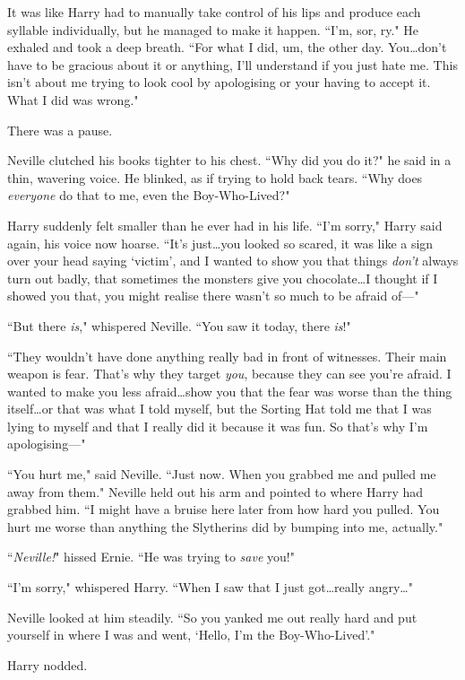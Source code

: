 It was like Harry had to manually take control of his lips and produce each syllable individually, but he managed to make it happen. ``I'm, sor, ry." He exhaled and took a deep breath. ``For what I did, um, the other day. You…don't have to be gracious about it or anything, I'll understand if you just hate me. This isn't about me trying to look cool by apologising or your having to accept it. What I did was wrong."

There was a pause.

Neville clutched his books tighter to his chest. ``Why did you do it?" he said in a thin, wavering voice. He blinked, as if trying to hold back tears. ``Why does \emph{everyone} do that to me, even the Boy-Who-Lived?"

Harry suddenly felt smaller than he ever had in his life. ``I'm sorry," Harry said again, his voice now hoarse. ``It's just…you looked so scared, it was like a sign over your head saying `victim', and I wanted to show you that things \emph{don't} always turn out badly, that sometimes the monsters give you chocolate…I thought if I showed you that, you might realise there wasn't so much to be afraid of—"

``But there \emph{is}," whispered Neville. ``You saw it today, there \emph{is}!"

``They wouldn't have done anything really bad in front of witnesses. Their main weapon is fear. That's why they target \emph{you}, because they can see you're afraid. I wanted to make you less afraid…show you that the fear was worse than the thing itself…or that was what I told myself, but the Sorting Hat told me that I was lying to myself and that I really did it because it was fun. So that's why I'm apologising—"

``You hurt me," said Neville. ``Just now. When you grabbed me and pulled me away from them." Neville held out his arm and pointed to where Harry had grabbed him. ``I might have a bruise here later from how hard you pulled. You hurt me worse than anything the Slytherins did by bumping into me, actually."

``\emph{Neville!}" hissed Ernie. ``He was trying to \emph{save} you!"

``I'm sorry," whispered Harry. ``When I saw that I just got…really angry…"

Neville looked at him steadily. ``So you yanked me out really hard and put yourself in where I was and went, `Hello, I'm the Boy-Who-Lived'."

Harry nodded.

